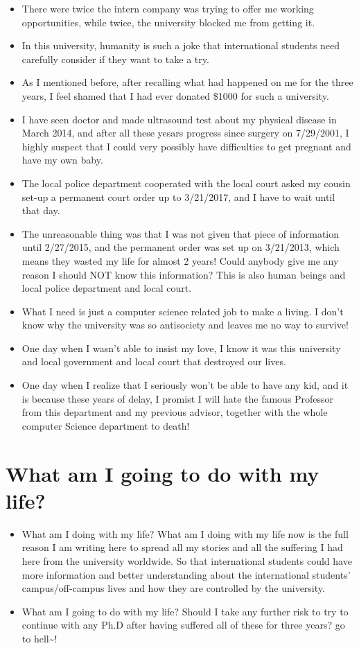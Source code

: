 \documentclass[9pt,b5paper]{article}
\begin{document}
\begin{itemize}
\item There were twice the intern company was trying to offer me working opportunities, while twice, the university blocked me from getting it.
\item In this university, humanity is such a joke that international students need carefully consider if they want to take a try.
\item As I mentioned before, after recalling what had happened on me for the three years, I feel shamed that I had ever donated \$1000 for such a university.
\item I have seen doctor and made ultrasound test about my physical disease in March 2014, and after all these yesars progress since surgery on 7/29/2001, I highly suspect that I could very possibly have difficulties to get pregnant and have my own baby.
\item The local police department cooperated with the local court asked my cousin set-up a permanent court order up to 3/21/2017, and I have to wait until that day.
\item The unreasonable thing was that I was not given that piece of information until 2/27/2015, and the permanent order was set up on 3/21/2013, which means they wasted my life for almost 2 years! Could anybody give me any reason I should NOT know this information? This is also human beings and local police department and local court.
\item What I need is just a computer science related job to make a living. I don't know why the university was so antisociety and leaves me no way to survive!
\item One day when I wasn't able to insist my love, I know it was this university and local government and local court that destroyed our lives.
\item One day when I realize that I seriously won't be able to have any kid, and it is because these years of delay, I promist I will hate the famous Professor from this department and my previous advisor, together with the whole computer Science department to death!
\end{itemize}

\section{What am I going to do with my life?}
\label{sec-7}
\begin{itemize}
\item What am I doing with my life? What am I doing with my life now is the full reason I am writing here to spread all my stories and all the suffering I had here from the university worldwide. So that international students could have more information and better understanding about the international students' campus/off-campus lives and how they are controlled by the university.
\item What am I going to do with my life? Should I take any further risk to try to continue with any Ph.D after having suffered all of these for three years? go to hell\textasciitilde{}!
\end{itemize}
\end{document}
